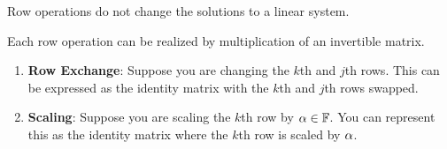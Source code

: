 \begin{thm}
    Row operations do not change the solutions to a linear system.
\end{thm}

\begin{prop}
    Each row operation can be realized by multiplication of an invertible matrix. 
    \begin{enumerate}
        \item \textbf{Row Exchange}: Suppose you are changing the $k$th and $j$th rows. This can be expressed as the identity matrix with the  
        $k$th and $j$th rows swapped.
        
        \item \textbf{Scaling}: Suppose you are scaling the $k$th row by $\alpha \in \mathbb{F}$. You can represent this as the identity matrix where the
        $k$th row is scaled by $\alpha$.        
    \end{enumerate}
\end{prop}

